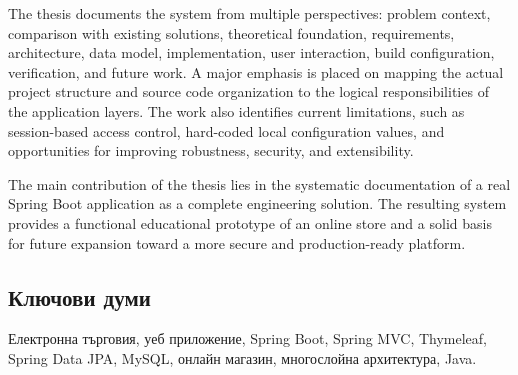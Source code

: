 The thesis documents the system from multiple perspectives: problem context, comparison with existing solutions, theoretical foundation, requirements, architecture, data model, implementation, user interaction, build configuration, verification, and future work. A major emphasis is placed on mapping the actual project structure and source code organization to the logical responsibilities of the application layers. The work also identifies current limitations, such as session-based access control, hard-coded local configuration values, and opportunities for improving robustness, security, and extensibility.

The main contribution of the thesis lies in the systematic documentation of a real Spring Boot application as a complete engineering solution. The resulting system provides a functional educational prototype of an online store and a solid basis for future expansion toward a more secure and production-ready platform.

\subsection{Ключови думи}

Електронна търговия, уеб приложение, Spring Boot, Spring MVC, Thymeleaf, Spring Data JPA, MySQL, онлайн магазин, многослойна архитектура, Java.

